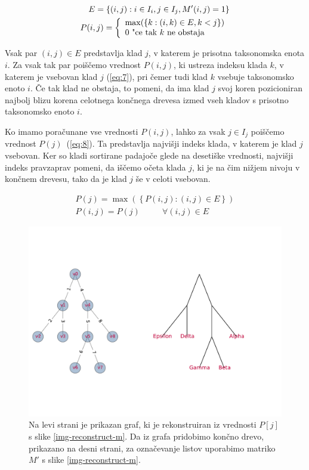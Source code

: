 \documentclass[a4paper, 12pt]{book}
\begin{document}
\begin{align}
	E = \left\{ {(i, j): i \in I_i, j \in I_j, M'(i, j) = 1} \right\} \label{eq:6} \\
	P(i, j) = 
		\left\{
		\begin{array}{ll}
			\max(\left\{k: (i, k) \in E, k < j\right\}) \\
			0 $      "ce tak $k$ ne obstaja$
		\end{array}
		\right.
	\label{eq:7}
\end{align}

Vsak par $(i, j) \in E$ predstavlja klad $j$, v katerem je prisotna taksonomska
enota $i$. Za vsak tak par poiščemo vrednost $P(i, j)$, ki ustreza indeksu klada
$k$, v katerem je vsebovan klad $j$ (\ref{eq:7}), pri čemer tudi klad $k$ vsebuje
taksonomsko enoto $i$. Če tak klad ne obstaja, to pomeni, da ima klad $j$
svoj koren pozicioniran najbolj blizu korena celotnega končnega drevesa izmed vseh
kladov s prisotno taksonomsko enoto $i$. 

Ko imamo poračunane vse vrednosti $P(i, j)$, lahko za vsak $j \in I_j$ poiščemo
vrednost $P(j)$~(\ref{eq:8}). Ta predstavlja najvišji indeks klada, v katerem je
klad $j$ vsebovan. Ker so kladi sortirane padajoče glede na desetiške
vrednosti, najvišji indeks pravzaprav pomeni, da iščemo očeta klada $j$, ki je
na čim nižjem nivoju v končnem drevesu, tako da je klad $j$ še v celoti vsebovan.
	
\begin{align}
	P(j) = \max(\left\{P(i, j): (i, j) \in E\right\}) \label{eq:8} \\
	P(i, j) = P(j)   ~~~~~~~~~~~~  \forall (i, j) \in E \label{eq:9}
\end{align}

\begin{figure}[h!]
	\begin{center}
		\includegraphics[scale=0.67, clip=true, trim=0 3cm 3cm 3cm]{gfx/tree_reconstruct_1.pdf}
	\end{center}
	\caption{
		Na levi strani je prikazan graf, ki je rekonstruiran iz vrednosti 
		$P[j]$ s slike \ref{img-reconstruct-m}. Da iz grafa pridobimo 
		končno drevo, prikazano na desni strani, za označevanje listov 
		uporabimo matriko $M'$ s slike \ref{img-reconstruct-m}.
	}
	\label{img-reconstruct-1}
\end{figure}
\end{document}
